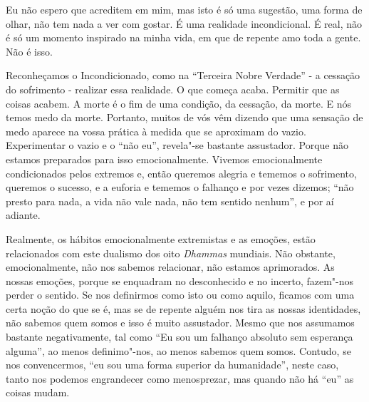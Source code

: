 Eu não espero que acreditem em mim, mas isto é só uma sugestão, uma
forma de olhar, não tem nada a ver com gostar. É uma realidade
incondicional. É real, não é só um momento inspirado na minha vida, em
que de repente amo toda a gente. Não é isso.

Reconheçamos o Incondicionado, como na ``Terceira Nobre Verdade'' - a
cessação do sofrimento - realizar essa realidade. O que começa acaba.
Permitir que as coisas acabem. A morte é o fim de uma condição, da
cessação, da morte. E nós temos medo da morte. Portanto, muitos de vós
vêm dizendo que uma sensação de medo aparece na vossa prática à medida
que se aproximam do vazio. Experimentar o vazio e o ``não eu'',
revela"-se bastante assustador. Porque não estamos preparados para isso
emocionalmente. Vivemos emocionalmente condicionados pelos extremos e,
então queremos alegria e tememos o sofrimento, queremos o sucesso, e a
euforia e tememos o falhanço e por vezes dizemos; ``não presto para
nada, a vida não vale nada, não tem sentido nenhum'', e por aí adiante.

Realmente, os hábitos emocionalmente extremistas e as emoções, estão
relacionados com este dualismo dos oito \emph{Dhammas} mundiais. Não
obstante, emocionalmente, não nos sabemos relacionar, não estamos
aprimorados. As nossas emoções, porque se enquadram no desconhecido e no
incerto, fazem"-nos perder o sentido. Se nos definirmos como isto ou como
aquilo, ficamos com uma certa noção do que se é, mas se de repente
alguém nos tira as nossas identidades, não sabemos quem somos e isso é
muito assustador. Mesmo que nos assumamos bastante negativamente, tal
como ``Eu sou um falhanço absoluto sem esperança alguma'', ao menos
definimo"-nos, ao menos sabemos quem somos. Contudo, se nos convencermos,
``eu sou uma forma superior da humanidade'', neste caso, tanto nos
podemos engrandecer como menosprezar, mas quando não há ``eu'' as coisas
mudam.

